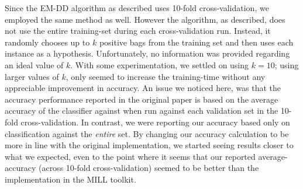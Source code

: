 \documentclass[conference]{IEEEtran}
\begin{document}
Since the EM-DD algorithm as described uses 10-fold cross-validation, we employed the same method as well. However the algorithm, as described, does not use the entire training-set during each cross-validation run. Instead, it randomly chooses up to $k$ positive bags from the training set and then uses each instance as a hypothesis. Unfortunately, no information was provided regarding an ideal value of $k$. With some experimentation, we settled on using $k = 10$; using larger values of $k$, only seemed to increase the training-time without any appreciable improvement in accuracy. An issue we noticed here, was that the accuracy performance reported in the original paper is based on the average accuracy of the classifier against when run against each validation set in the 10-fold cross-validation. In contrast, we were reporting our accuracy based only on classification against the \textit{entire} set. By changing our accuracy calculation to be more in line with the original implementation, we started seeing results closer to what we expected, even to the point where it seems that our reported average-accuracy (across 10-fold cross-validation) seemed to be better than the implementation in the MILL toolkit.
\end{document}
